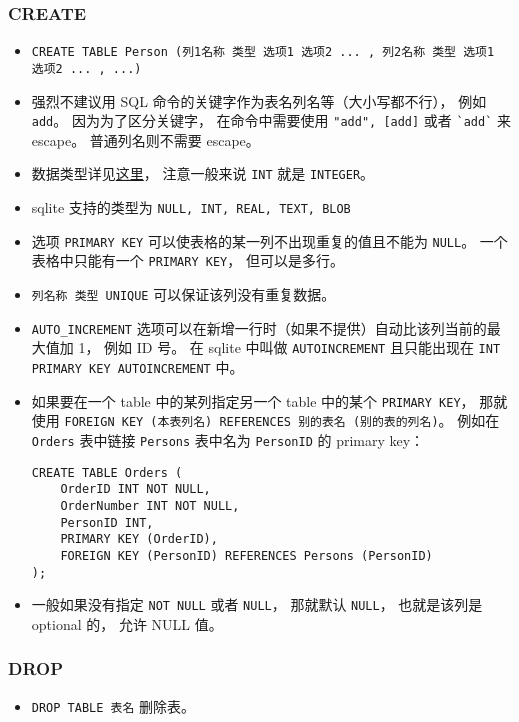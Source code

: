 \subsubsection{CREATE}
\begin{itemize}
\item \verb`CREATE TABLE Person (列1名称 类型 选项1 选项2 ... , 列2名称 类型 选项1 选项2 ... , ...)`
\item 强烈不建议用 SQL 命令的关键字作为表名列名等（大小写都不行）， 例如 \verb`add`。 因为为了区分关键字， 在命令中需要使用 \verb`"add", [add]` 或者 \verb|`add`| 来 escape。 普通列名则不需要 escape。
\item 数据类型详见\href{https://www.w3schools.com/sql/sql_datatypes.asp}{这里}， 注意一般来说 \verb`INT` 就是 \verb`INTEGER`。
\item sqlite 支持的类型为 \verb`NULL, INT, REAL, TEXT, BLOB`
\item 选项 \verb`PRIMARY KEY` 可以使表格的某一列不出现重复的值且不能为 \verb`NULL`。 一个表格中只能有一个 \verb`PRIMARY KEY`， 但可以是多行。
\item \verb`列名称 类型 UNIQUE` 可以保证该列没有重复数据。
\item \verb`AUTO_INCREMENT` 选项可以在新增一行时（如果不提供）自动比该列当前的最大值加 1， 例如 ID 号。 在 sqlite 中叫做 \verb`AUTOINCREMENT` 且只能出现在 \verb`INT PRIMARY KEY AUTOINCREMENT` 中。
\item 如果要在一个 table 中的某列指定另一个 table 中的某个 \verb`PRIMARY KEY`， 那就使用 \verb`FOREIGN KEY (本表列名) REFERENCES 别的表名 (别的表的列名)`。 例如在 \verb`Orders` 表中链接 \verb`Persons` 表中名为 \verb`PersonID` 的 primary key：
\begin{lstlisting}[language=none]
CREATE TABLE Orders (
    OrderID INT NOT NULL,
    OrderNumber INT NOT NULL,
    PersonID INT,
    PRIMARY KEY (OrderID),
    FOREIGN KEY (PersonID) REFERENCES Persons (PersonID)
);
\end{lstlisting}
\item 一般如果没有指定 \verb`NOT NULL` 或者 \verb`NULL`， 那就默认 \verb`NULL`， 也就是该列是 optional 的， 允许 NULL 值。
\end{itemize}

\subsubsection{DROP}
\begin{itemize}
\item \verb`DROP TABLE 表名` 删除表。
\end{itemize}


